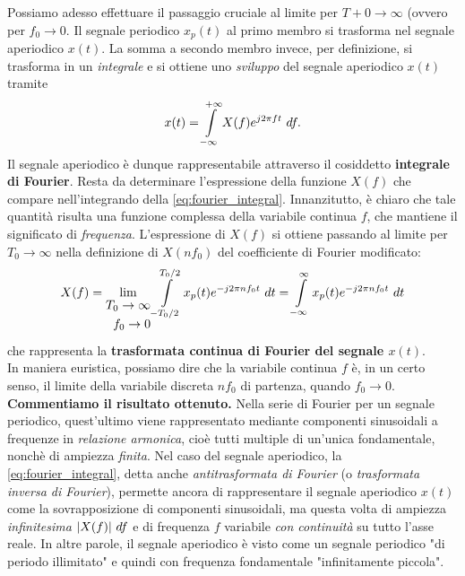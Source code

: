 \documentclass[12pt,oneside,openany]{memoir}
\numberwithin{equation}{subsection}
\DeclarePairedDelimiter{\abs}{\lvert}{\rvert}
\newcommand{\dt}{\ dt}
\newcommand{\df}{\ df}
\begin{document}
Possiamo adesso effettuare il passaggio cruciale al limite per $T+0 \rightarrow \infty$ (ovvero per $f_0 \rightarrow 0$. Il segnale periodico $x_p(t)$ al primo membro si trasforma nel segnale aperiodico $x(t)$. La somma a secondo membro invece, per definizione, si trasforma in un \textit{integrale} e si ottiene uno \textit{sviluppo} del segnale aperiodico $x(t)$ tramite
\begin{equation}\label{eq:fourier_integral}
	x(t) = \int\displaylimits_{-\infty}^{+\infty} X(f) e^{j 2 \pi f t} \df.
\end{equation}
Il segnale aperiodico \`e dunque rappresentabile attraverso il cosiddetto \textbf{integrale di Fourier}. Resta da determinare l'espressione della funzione $X(f)$ che compare nell'integrando della \eqref{eq:fourier_integral}. Innanzitutto, \`e chiaro che tale quantit\`a risulta una funzione complessa della variabile continua $f$, che mantiene il significato di \textit{frequenza}. L'espressione di $X(f)$ si ottiene passando al limite per $T_0 \rightarrow \infty$ nella definizione di $X(nf_0)$ del coefficiente di Fourier modificato:
\begin{equation}\label{eq:tcf_coefficient}
	X(f) = \lim_{\begin{split}T_0 \rightarrow \infty \\ f_0 \rightarrow 0\end{split}} \int\displaylimits_{-T_0/2}^{T_0/2} x_p(t) e^{-j 2 \pi n f_0 t} \dt = \int\displaylimits_{-\infty}^{\infty} x_p(t) e^{-j 2 \pi n f_0 t} \dt 
\end{equation}
che rappresenta la \textbf{trasformata continua di Fourier del segnale $x(t)$}.\\
In maniera euristica, possiamo dire che la variabile continua $f$ \`e, in un certo senso, il limite della variabile discreta $n f_0$ di partenza, quando $f_0 \rightarrow 0$.
\bigbreak
\textbf{Commentiamo il risultato ottenuto.} Nella serie di Fourier per un segnale periodico, quest'ultimo viene rappresentato mediante componenti sinusoidali a frequenze in \textit{relazione armonica}, cio\`e tutti multiple di un'unica fondamentale, nonch\`e di ampiezza \textit{finita}. Nel caso del segnale aperiodico, la \eqref{eq:fourier_integral}, detta anche \textit{antitrasformata di Fourier} (o \textit{trasformata inversa di Fourier}), permette ancora di rappresentare il segnale aperiodico $x(t)$ come la sovrapposizione di componenti sinusoidali, ma questa volta di ampiezza \textit{infinitesima} $\abs{X(f)} \df$ e di frequenza $f$ variabile \textit{con continuit\`a} su tutto l'asse reale. In altre parole, il segnale aperiodico \`e visto come un segnale periodico "di periodo illimitato" e quindi con frequenza fondamentale "infinitamente piccola".
\end{document}
